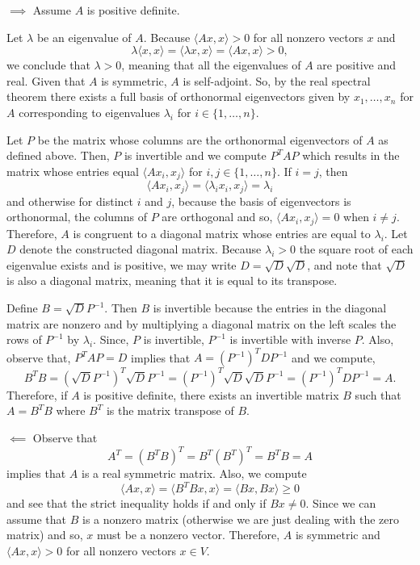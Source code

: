 \documentclass{article}
\begin{document}
$\implies$ Assume $A$ is positive definite. 

Let $\lambda$ be an eigenvalue of $A$. Because $\langle Ax, x\rangle > 0$ for all nonzero vectors $x$ and
\[ \lambda\langle x, x \rangle = \langle \lambda x, x\rangle = \langle Ax, x\rangle > 0,\]
we conclude that $\lambda >0$, meaning that all the eigenvalues of $A$ are positive and real. Given that $A$ is symmetric, $A$ is self-adjoint. So, by the real spectral theorem there exists a full basis of orthonormal eigenvectors given by $x_1, \dots, x_n$ for $A$ corresponding to eigenvalues $\lambda_i$ for $i\in \{1, \dots, n\}$.

Let $P$ be the matrix whose columns are the orthonormal eigenvectors of $A$ as defined above. Then, $P$ is invertible and we compute $P^T A P$ which results in the matrix whose entries equal $\langle Ax_i, x_j\rangle$ for $i,j\in\{1,\dots, n\}$. If $i = j$, then 
\[ \langle Ax_i, x_j \rangle = \langle \lambda_i x_i, x_j \rangle = \lambda_i \]
and otherwise for distinct $i$ and $j$, because the basis of eigenvectors is orthonormal, the columns of $P$ are orthogonal and so, $\langle Ax_i, x_j \rangle = 0$ when $i\neq j$. Therefore, $A$ is congruent to a diagonal matrix whose entries are equal to $\lambda_i$. Let $D$ denote the constructed diagonal matrix. Because $\lambda_i>0$ the square root of each eigenvalue exists and is positive, we may write $D = \sqrt{D}\sqrt{D}$, and note that $\sqrt{D}$ is also a diagonal matrix, meaning that it is equal to its transpose. 

Define $B = \sqrt{D}P^{-1}$. Then $B$ is invertible because the entries in the diagonal matrix are nonzero and by multiplying a diagonal matrix on the left scales the rows of $P^{-1}$ by $\lambda_i$. Since, $P$ is invertible, $P^{-1}$ is invertible with inverse $P$. Also, observe that, $P^T A P = D$ implies that $A = (P^{-1})^T D P^{-1}$ and we compute, 
	\[ B^T B = (\sqrt{D}P^{-1})^T \sqrt{D}P^{-1} = (P^{-1})^T \sqrt{D}\sqrt{D}P^{-1} = (P^{-1})^T D P^{-1} = A.\]
Therefore, if $A$ is positive definite, there exists an invertible matrix $B$ such that $A = B^TB$ where $B^T$ is the matrix transpose of $B$.

$\impliedby$ Observe that 
	\[A ^T = (B^TB)^T = B^T (B^T)^T = B^T B = A\]
	implies that $A$ is a real symmetric matrix. Also, we compute
	\[ \langle Ax, x \rangle = \langle B^T Bx, x \rangle = \langle Bx, Bx \rangle \geq 0\]
	and see that the strict inequality holds if and only if $Bx\neq 0$. Since we can assume that $B$ is a nonzero matrix (otherwise we are 
	just dealing with the zero matrix) and so, $x$ must be a nonzero vector. Therefore, $A$ is symmetric and $\langle Ax, x \rangle > 0 $ 
	for all nonzero vectors $x\in V$.
	
\end{document}
